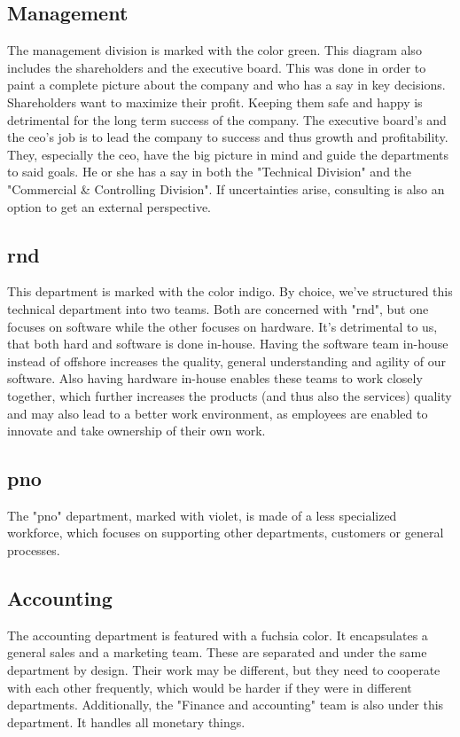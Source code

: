 \subsection{Management}\label{org-management}
The management division is marked with the color green. This diagram also includes the shareholders and the executive board. This was done in order to paint a complete picture about the company and who has a say in key decisions.
\newline
Shareholders want to maximize their profit. Keeping them safe and happy is detrimental for the long term success of the company.
\newline
The executive board's and the \acs{ceo}'s job is to lead the company to success and thus growth and profitability. They, especially the \acs{ceo}, have the big picture in mind and guide the departments to said goals. He or she has a say in both the "Technical Division" and the "Commercial \& Controlling Division".
\newline
\newline
If uncertainties arise, consulting is also an option to get an external perspective.
\subsection{\acl{rnd}}\label{org-rnd}
This department is marked with the color indigo.
\newline
By choice, we've structured this technical department into two teams. Both are concerned with "\acl{rnd}", but one focuses on software while the other focuses on hardware. It's detrimental to us, that both hard and software is done in-house. Having the software team in-house instead of offshore increases the quality, general understanding and agility of our software. Also having hardware in-house enables these teams to work closely together, which further increases the products (and thus also the services) quality and may also lead to a better work environment, as employees are enabled to innovate and take ownership of their own work. \cite{wang_2022_employee}
\subsection{\acl{pno}}
The "\acl{pno}" department, marked with violet, is made of a less specialized workforce, which focuses on supporting other departments, customers or general processes.
\subsection{Accounting}
The accounting department is featured with a fuchsia color. It encapsulates a general sales and a marketing team. These are separated and under the same department by design. Their work may be different, but they need to cooperate with each other frequently, which would be harder if they were in different departments.
Additionally, the "Finance and accounting" team is also under this department. It handles all monetary things.

